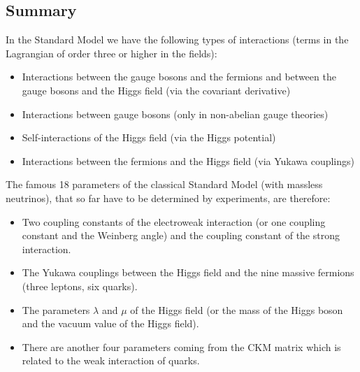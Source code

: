 \documentclass[11pt]{amsart}
\theoremstyle{definition}
\theoremstyle{remark}
\numberwithin{equation}{section}
\begin{document}
\subsection{Summary}
In the Standard Model we have the following types of interactions (terms in the Lagrangian of order three or higher in the fields):
\begin{itemize}
\item Interactions between the gauge bosons and the fermions and between the gauge bosons and the Higgs field (via the covariant derivative)
\item Interactions between gauge bosons (only in non-abelian gauge theories)
\item Self-interactions of the Higgs field (via the Higgs potential)
\item Interactions between the fermions and the Higgs field (via Yukawa couplings)
\end{itemize}
The famous 18 parameters of the classical Standard Model (with massless neutrinos), that so far have to be determined by experiments, are therefore:
\begin{itemize}
\item Two coupling constants of the electroweak interaction (or one coupling constant and the Weinberg angle) and the coupling constant of the strong interaction.
\item The Yukawa couplings between the Higgs field and the nine massive fermions (three leptons, six quarks).
\item The parameters $\lambda$ and $\mu$ of the Higgs field (or the mass of the Higgs boson and the vacuum value of the Higgs field).
\item There are another four parameters coming from the CKM matrix which is related to the weak interaction of quarks.
\end{itemize}
\end{document}
